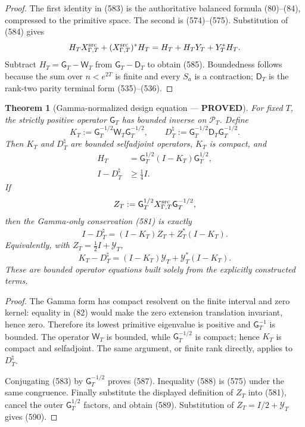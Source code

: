 \documentclass[11pt]{article}
\newtheorem{theorem}{Theorem}
\newcommand{\PROVED}{\textcolor{green!45!black}{\textbf{PROVED}}}
\begin{document}
\begin{proof}
The first identity in (583) is the authoritative balanced formula
(80)--(84), compressed to the primitive space.  The second is (574)--(575).
Substitution of (584) gives
\[
 H_TX_{\Gamma,T}^{\rm src}
 +(X_{\Gamma,T}^{\rm src})^*H_T
 =H_T+H_TY_T+Y_T^*H_T.
\]
Subtract \(H_T=\mathsf G_T-\mathsf W_T\) from
\(\mathsf G_T-\mathsf D_T\) to obtain (585).  Boundedness follows because
the sum over \(n<e^{2T}\) is finite and every \(S_a\) is a contraction;
\(\mathsf D_T\) is the rank-two parity terminal form (535)--(536).
\end{proof}

\begin{theorem}[Gamma-normalized design equation --- \PROVED]
For fixed \(T\), the strictly positive operator \(\mathsf G_T\) has bounded
inverse on \(\mathcal P_T\).  Define
\begin{equation}
 K_T:=\mathsf G_T^{-1/2}\mathsf W_T\mathsf G_T^{-1/2},
 \qquad
 D_T^\natural:=
 \mathsf G_T^{-1/2}\mathsf D_T\mathsf G_T^{-1/2}.     \tag{586}
\end{equation}
Then \(K_T\) and \(D_T^\natural\) are bounded selfadjoint operators,
\(K_T\) is compact, and
\begin{align}
 H_T&=\mathsf G_T^{1/2}(I-K_T)\mathsf G_T^{1/2},
                                                               \tag{587}\\
 I-D_T^\natural&\ge\frac14I.                         \tag{588}
\end{align}
If
\[
 Z_T:=\mathsf G_T^{1/2}
 X_{\Gamma,T}^{\rm src}\mathsf G_T^{-1/2},
\]
then the Gamma-only conservation (581) is exactly
\begin{equation}
 \boxed{
 I-D_T^\natural
 =(I-K_T)Z_T+Z_T^*(I-K_T).}                          \tag{589}
\end{equation}
Equivalently, with \(Z_T=\frac12I+\mathcal Y_T\),
\begin{equation}
 \boxed{
 K_T-D_T^\natural
 =(I-K_T)\mathcal Y_T+
   \mathcal Y_T^*(I-K_T).}                           \tag{590}
\end{equation}
These are bounded operator equations built solely from the explicitly
constructed terms.
\end{theorem}

\begin{proof}
The Gamma form has compact resolvent on the finite interval and zero
kernel: equality in (82) would make the zero extension translation
invariant, hence zero.  Therefore its lowest primitive eigenvalue is
positive and \(\mathsf G_T^{-1}\) is bounded.  The operator
\(\mathsf W_T\) is bounded, while \(\mathsf G_T^{-1/2}\) is compact;
hence \(K_T\) is compact and selfadjoint.  The same argument, or finite
rank directly, applies to \(D_T^\natural\).

Conjugating (583) by \(\mathsf G_T^{-1/2}\) proves (587).
Inequality (588) is (575) under the same congruence.  Finally substitute
the displayed definition of \(Z_T\) into (581), cancel the outer
\(\mathsf G_T^{1/2}\) factors, and obtain (589).  Substitution of
\(Z_T=I/2+\mathcal Y_T\) gives (590).
\end{proof}
\end{document}
